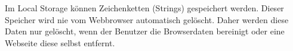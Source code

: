 \label{sec:localstorage}

Im Local Storage können Zeichenketten (Strings) gespeichert werden. 
Dieser Speicher wird nie vom Webbrowser automatisch gelöscht. 
Daher werden diese Daten nur gelöscht, wenn der Benutzer die Browserdaten bereinigt oder eine Webseite diese selbst entfernt. 
\cite{w3LocalStorage}

